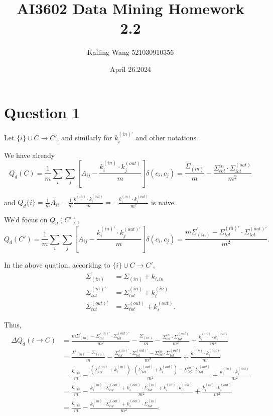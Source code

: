 \documentclass{article}
\begin{document}
\title{AI3602 Data Mining Homework 2.2}
\author{Kailing Wang 521030910356}
\date{April 26.2024}
\maketitle

\section*{Question 1}
Let $\{i\}\cup C \rightarrow C'$, and similarly for $k_i^{(in)'}$ and other notations.

We have already 
\[
	Q_d(C) = \frac{1}{m} \sum_i \sum_j \left[A_{ij} - \frac{k_i^{(in)}\cdot k_j^{(out)}}{m}\right]\delta (c_i, c_j) = \frac{\Sigma_{(in)}}{m} - \frac{\Sigma_{tot}^{{in}}\cdot\Sigma_{tot}^{(out)}}{m^2}
\]

and $Q_d{\{i\}} = \frac{1}{m} A_{ii} - \frac{1}{m}\frac{k_i^{(in)}\cdot k_i^{(out)}}{m} = -\frac{k_i^{(in)}\cdot k_i^{(out)}}{m^2}$ is naive.

We'd focus on $Q_d(C')$, 
\[
	Q_d(C') = \frac{1}{m} \sum_i \sum_j \left[A_{ij} - \frac{k_i^{(in)'}\cdot k_j^{(out)'}}{m}\right]\delta (c_i, c_j) = \frac{m\Sigma_{(in)}^{'} - \Sigma_{tot}^{(in)'}\cdot\Sigma_{tot}^{(out)'}}{m^2}.
\]

In the above quation, accoridng to $\{i\}\cup C \rightarrow C'$, 
\begin{align*}
	\Sigma_{(in)}^{'}     & = \Sigma_{(in)} + k_{i, in}           \\
	\Sigma_{tot}^{(in)'}  & = \Sigma_{tot}^{(in)} + k_i^{(in)}     \\
	\Sigma_{tot}^{(out)'} & = \Sigma_{tot}^{(out)} + k_i^{(out)}.
\end{align*}

Thus,
\begin{align*}
	\Delta Q_d(i \rightarrow C) & = \frac{m\Sigma_{(in)}^{'} - \Sigma_{tot}^{(in)'}\cdot\Sigma_{tot}^{(out)'}}{m^2} - \frac{\Sigma_{(in)}}{m} - \frac{\Sigma_{tot}^{{in}}\cdot\Sigma_{tot}^{(out)}}{m^2} + \frac{k_i^{(in)}\cdot k_i^{(out)}}{m^2} \\
	                            & = \frac{\Sigma_{(in)}^{'}-\Sigma_{(in)}}{m} - \frac{\Sigma_{tot}^{(in)'}\cdot\Sigma_{tot}^{(out)'} - \Sigma_{tot}^{{in}}\cdot\Sigma_{tot}^{(out)}}{m^2} + \frac{k_i^{(in)}\cdot k_i^{(out)}}{m^2}                \\
	                            & = \frac{k_{i, in}}{m} - \frac{(\Sigma_{tot}^{(in)} + k_i^{(in)})\cdot(\Sigma_{tot}^{(out)} + k_i^{(out)}) - \Sigma_{tot}^{{in}}\cdot\Sigma_{tot}^{(out)}}{m^2} + \frac{k_i^{(in)}\cdot k_i^{(out)}}{m^2}        \\
	                            & = \frac{k_{i, in}}{m} - \frac{k_i^{(in)}\cdot\Sigma_{tot}^{(out)} + k_i^{(out)}\cdot\Sigma_{tot}^{(in)} + k_i^{(in)}\cdot k_i^{(out)}}{m^2} + \frac{k_i^{(in)}\cdot k_i^{(out)}}{m^2}                           \\	
	                            & = \frac{k_{i, in}}{m} - \frac{k_i^{(in)}\cdot\Sigma_{tot}^{(out)} + k_i^{(out)}\cdot\Sigma_{tot}^{(in)}}{m^2}.		
\end{align*}
\end{document}
